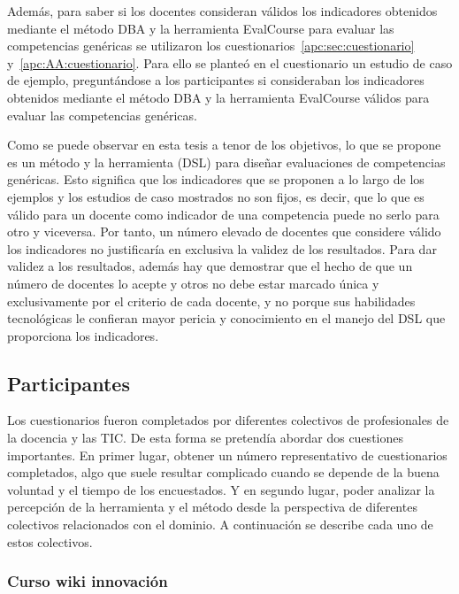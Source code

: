 Además, para saber si los docentes consideran válidos los indicadores obtenidos mediante el método DBA y la herramienta EvalCourse para evaluar las competencias genéricas se utilizaron los cuestionarios~\ref{apc:sec:cuestionario} y~\ref{apc:AA:cuestionario}. Para ello se planteó en el cuestionario un estudio de caso de ejemplo, preguntándose a los participantes si consideraban los indicadores obtenidos mediante el método DBA y la herramienta EvalCourse válidos para evaluar las competencias genéricas.%

Como se puede observar en esta tesis a tenor de los objetivos, lo que se propone es un método y la herramienta (DSL) para diseñar evaluaciones de competencias genéricas. Esto significa que los indicadores que se proponen a lo largo de los ejemplos y los estudios de caso mostrados no son fijos, es decir, que lo que es válido para un docente como indicador de una competencia puede no serlo para otro y viceversa. Por tanto, un número elevado de docentes que considere válido los indicadores no justificaría en exclusiva la validez de los resultados. Para dar validez a los resultados, además hay que demostrar que el hecho de que un número de docentes lo acepte y otros no debe estar marcado única y exclusivamente por el criterio de cada docente, y no porque sus habilidades tecnológicas le confieran mayor pericia y conocimiento en el manejo del DSL que proporciona los indicadores.

\subsection{Participantes} \label{eva:participantes}

Los cuestionarios fueron completados por diferentes colectivos de profesionales de la docencia y las TIC. De esta forma se pretendía abordar dos cuestiones importantes. En primer lugar, obtener un número representativo de cuestionarios completados, algo que suele resultar complicado cuando se depende de la buena voluntad y el tiempo de los encuestados. Y en segundo lugar, poder analizar la percepción de la herramienta y el método desde la perspectiva de diferentes colectivos relacionados con el dominio. A continuación se describe cada uno de estos colectivos.

	\subsubsection{Curso wiki innovación}

